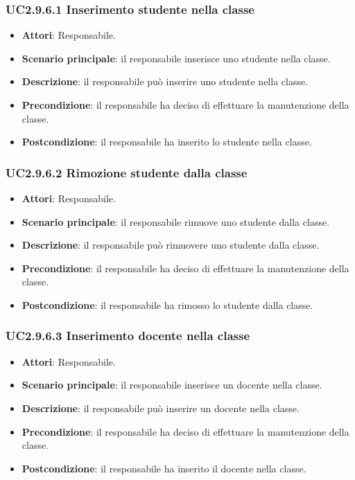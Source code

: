 \subsubsection{UC2.9.6.1 Inserimento studente nella classe}
\begin{itemize}
\item \textbf{Attori}: Responsabile.
\item \textbf{Scenario principale}: il responsabile inserisce uno studente nella classe.
\item \textbf{Descrizione}: il responsabile può inserire uno studente nella classe.
\item \textbf{Precondizione}: il responsabile ha deciso di effettuare la manutenzione della classe.
\item \textbf{Postcondizione}: il responsabile ha inserito lo studente nella classe.
\end{itemize}
\subsubsection{UC2.9.6.2 Rimozione studente dalla classe}
\begin{itemize}
\item \textbf{Attori}: Responsabile.
\item \textbf{Scenario principale}: il responsabile rimuove uno studente dalla classe.
\item \textbf{Descrizione}: il responsabile può rimuovere uno studente dalla classe.
\item \textbf{Precondizione}: il responsabile ha deciso di effettuare la manutenzione della classe.
\item \textbf{Postcondizione}: il responsabile ha rimosso lo studente dalla classe.
\end{itemize}
\subsubsection{UC2.9.6.3 Inserimento docente nella classe}
\begin{itemize}
\item \textbf{Attori}: Responsabile.
\item \textbf{Scenario principale}: il responsabile inserisce un docente nella classe.
\item \textbf{Descrizione}: il responsabile può inserire un docente nella classe.
\item \textbf{Precondizione}: il responsabile ha deciso di effettuare la manutenzione della classe.
\item \textbf{Postcondizione}: il responsabile ha inserito il docente nella classe.
\end{itemize}
